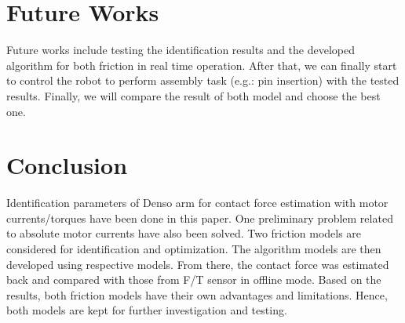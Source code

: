 \documentclass[letterpaper, 10 pt, conference]{ieeeconf}
\begin{document}
      \section{Future Works}
Future works include testing the identification results and the developed algorithm for both friction in real time operation. After that, we can finally start to control the robot to perform assembly task (e.g.: pin insertion) with the tested results. Finally, we will compare the result of both model and choose the best one.





      \section{Conclusion}
Identification parameters of Denso arm for contact force estimation with motor currents/torques have been done in this paper. One preliminary problem related to absolute motor currents have also been solved. Two friction models are considered for identification and optimization. The algorithm models are then developed using respective models. From there, the contact force was estimated back and compared with those from F/T sensor in offline mode. Based on the results, both friction models have their own advantages and limitations. Hence, both models are kept for further investigation and testing. 



\end{document}
